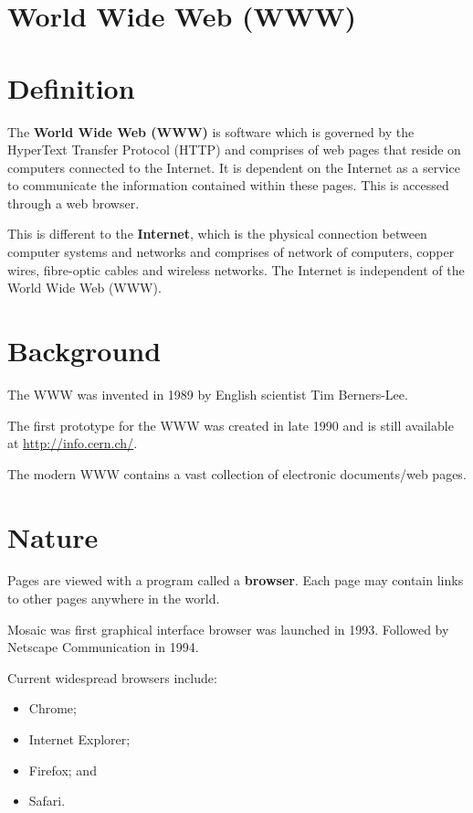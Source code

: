 \documentclass[a4paper]{systems-software}
\begin{document}
\newpage

\section{World Wide Web (WWW)}

\section*{Definition}

The \textbf{World Wide Web (WWW)} is software which is governed by the HyperText Transfer Protocol (HTTP) and comprises of web pages that reside on computers connected to the Internet. It is dependent on the Internet as a service to communicate the information contained within these pages. This is accessed through a web browser.

This is different to the \textbf{Internet}, which is the physical connection between computer systems and networks and comprises of network of computers, copper wires, fibre-optic cables and wireless networks. The Internet is independent of the World Wide Web (WWW).


\section*{Background}

The WWW was invented in 1989 by English scientist Tim Berners-Lee.

The first prototype for the WWW was created in late 1990 and is still available at \url{http://info.cern.ch/}.

The modern WWW contains a vast collection of electronic documents/web pages.


\section*{Nature}

Pages are viewed with a program called a \textbf{browser}. Each page may contain links to other pages anywhere in the world.

Mosaic was first graphical interface browser was launched in 1993. Followed by Netscape Communication in 1994.

Current widespread browsers include:
\begin{itemize}
	\item Chrome;
	\item Internet Explorer;
	\item Firefox; and
	\item Safari.
\end{itemize}
\end{document}
